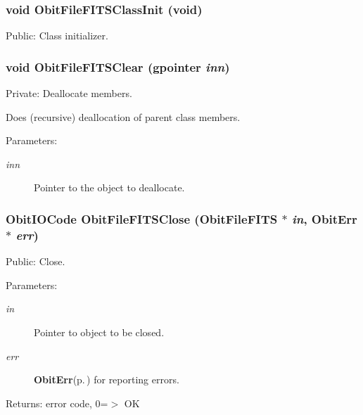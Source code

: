 \subsubsection{\setlength{\rightskip}{0pt plus 5cm}void Obit\-File\-FITSClass\-Init (void)}\label{ObitFileFITS_8c_a33}


Public: Class initializer. 

\subsubsection{\setlength{\rightskip}{0pt plus 5cm}void Obit\-File\-FITSClear (gpointer {\em inn})}\label{ObitFileFITS_8c_a4}


Private: Deallocate members. 

Does (recursive) deallocation of parent class members. \begin{Desc}
\item[Parameters:]
\begin{description}
\item[{\em inn}]Pointer to the object to deallocate. \end{description}
\end{Desc}
\subsubsection{\setlength{\rightskip}{0pt plus 5cm}Obit\-IOCode Obit\-File\-FITSClose ({\bf Obit\-File\-FITS} $\ast$ {\em in}, {\bf Obit\-Err} $\ast$ {\em err})}\label{ObitFileFITS_8c_a14}


Public: Close. 

\begin{Desc}
\item[Parameters:]
\begin{description}
\item[{\em in}]Pointer to object to be closed. \item[{\em err}]{\bf Obit\-Err}{\rm (p.\,\pageref{structObitErr})} for reporting errors. \end{description}
\end{Desc}
\begin{Desc}
\item[Returns:]error code, 0=$>$ OK \end{Desc}
